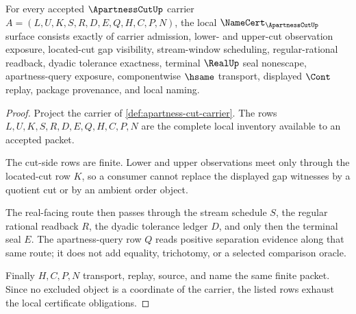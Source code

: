 \begin{theorem}
\label{thm:apartness-cut-namecert-obligations}
For every accepted $\ApartnessCutUp$ carrier $A=(L,U,K,S,R,D,E,Q,H,C,P,N)$, the local $\NameCert_{\ApartnessCutUp}$ surface consists exactly of carrier admission, lower- and upper-cut observation exposure, located-cut gap visibility, stream-window scheduling, regular-rational readback, dyadic tolerance exactness, terminal $\RealUp$ seal nonescape, apartness-query exposure, componentwise $\hsame$ transport, displayed $\Cont$ replay, package provenance, and local naming.
\end{theorem}
\begin{proof}
Project the carrier of \autoref{def:apartness-cut-carrier}. The rows $L,U,K,S,R,D,E,Q,H,C,P,N$ are the complete local inventory available to an accepted packet.

The cut-side rows are finite. Lower and upper observations meet only through the located-cut row $K$, so a consumer cannot replace the displayed gap witnesses by a quotient cut or by an ambient order object.

The real-facing route then passes through the stream schedule $S$, the regular rational readback $R$, the dyadic tolerance ledger $D$, and only then the terminal seal $E$. The apartness-query row $Q$ reads positive separation evidence along that same route; it does not add equality, trichotomy, or a selected comparison oracle.

Finally $H,C,P,N$ transport, replay, source, and name the same finite packet. Since no excluded object is a coordinate of the carrier, the listed rows exhaust the local certificate obligations.
\end{proof}


